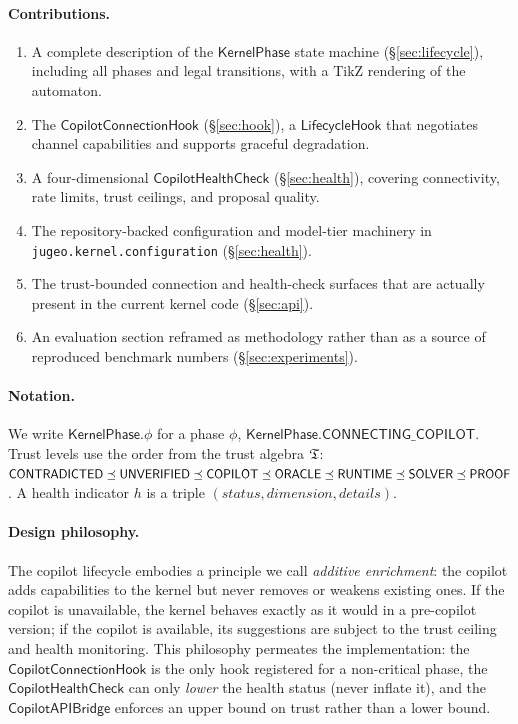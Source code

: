 \documentclass[11pt]{article}
\newcommand{\CCH}{\mathsf{CopilotConnectionHook}}
\newcommand{\CHC}{\mathsf{CopilotHealthCheck}}
\newcommand{\CAB}{\mathsf{CopilotAPIBridge}}
\newcommand{\KP}{\mathsf{KernelPhase}}
\newcommand{\LH}{\mathsf{LifecycleHook}}
\newcommand{\CONNECTING}{\mathsf{CONNECTING\_COPILOT}}
\begin{document}
\paragraph{Contributions.}
\begin{enumerate}[leftmargin=*]
  \item A complete description of the $\KP$ state machine
        (\S\ref{sec:lifecycle}), including all phases and legal transitions,
        with a TikZ rendering of the automaton.
  \item The $\CCH$ (\S\ref{sec:hook}), a
        $\LH$ that negotiates channel
        capabilities and supports graceful degradation.
  \item A four-dimensional $\CHC$
        (\S\ref{sec:health}), covering connectivity, rate limits,
        trust ceilings, and proposal quality.
  \item The repository-backed configuration and model-tier machinery in
        \texttt{jugeo.kernel.configuration} (\S\ref{sec:health}).
  \item The trust-bounded connection and health-check surfaces that are
        actually present in the current kernel code (\S\ref{sec:api}).
  \item An evaluation section reframed as methodology rather than as a
        source of reproduced benchmark numbers (\S\ref{sec:experiments}).
\end{enumerate}

\paragraph{Notation.}
We write $\KP.\phi$ for a phase $\phi$, \eg{}
$\KP.\CONNECTING$.  Trust levels use the order from the
\JuGeo{} trust algebra $\mathfrak{T}$:
$\mathsf{CONTRADICTED} \preceq \mathsf{UNVERIFIED} \preceq \mathsf{COPILOT} \preceq \mathsf{ORACLE}
 \preceq \mathsf{RUNTIME} \preceq \mathsf{SOLVER} \preceq \mathsf{PROOF}$.
A health indicator $h$ is a triple
$(\mathit{status}, \mathit{dimension}, \mathit{details})$.

\paragraph{Design philosophy.}
The copilot lifecycle embodies a principle we call
\emph{additive enrichment}: the copilot adds capabilities to the
kernel but never removes or weakens existing ones.  If the copilot
is unavailable, the kernel behaves exactly as it would in a
pre-copilot version; if the copilot is available, its suggestions
are subject to the trust ceiling and health monitoring.  This
philosophy permeates the implementation: the $\CCH$ is the
only hook registered for a non-critical phase, the
$\CHC$ can only \emph{lower} the health status (never
inflate it), and the $\CAB$ enforces an upper bound on
trust rather than a lower bound.
\end{document}
